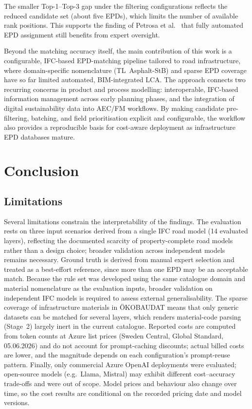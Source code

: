 \documentclass[10pt, a4paper, twocolumn]{article}
\begin{document}
The smaller Top-1--Top-3 gap under the filtering
configurations reflects the reduced candidate set (about five EPDs), which limits
the number of available rank positions. This supports the finding of Petrosa et
al.~\cite{Petrosa.2025} that fully automated EPD assignment still benefits from
expert oversight.

Beyond the matching accuracy itself, the main contribution of this work is a
configurable, IFC-based EPD-matching pipeline tailored to road infrastructure,
where domain-specific nomenclature (TL~Asphalt-StB) and sparse EPD coverage have so
far limited automated, BIM-integrated LCA. The approach
connects two recurring concerns in product and process modelling: interoperable,
IFC-based information management across early planning phases, and the integration
of digital sustainability data into AEC/FM workflows. By making candidate
pre-filtering, batching, and field prioritisation explicit and configurable, the
workflow also provides a reproducible basis for cost-aware deployment as
infrastructure EPD databases mature.

\section{Conclusion}

\subsection{Limitations}
    \label{sec:limitations}

Several limitations constrain the interpretability of the findings. The evaluation
rests on three input scenarios derived from a single IFC road model (14 evaluated
layers), reflecting the documented scarcity of property-complete road models rather
than a design choice; broader validation across independent models remains
necessary. Ground truth is derived from manual expert selection and treated as a
best-effort reference, since more than one EPD may be an acceptable match. 
Because the rule set was developed using the same catalogue domain and material nomenclature as the evaluation inputs, broader validation on independent IFC models is required to assess external generalisability.
The
sparse coverage of infrastructure materials in \"OKOBAUDAT means that only generic
datasets can be matched for several layers, which renders material-code parsing
(Stage~2) largely inert in the current catalogue. Reported costs are computed from
token counts at Azure list prices (Sweden Central, Global Standard, 05.06.2026)
and do not account for prompt-caching discounts; actual billed costs are lower, and
the magnitude depends on each configuration's prompt-reuse pattern. Finally, only
commercial Azure OpenAI deployments were evaluated; open-source models (e.g.\ Llama,
Mistral) may exhibit different cost--accuracy trade-offs and were out of scope.
Model prices and behaviour also change over time, so the cost results are
conditional on the recorded pricing date and model versions.
\end{document}
